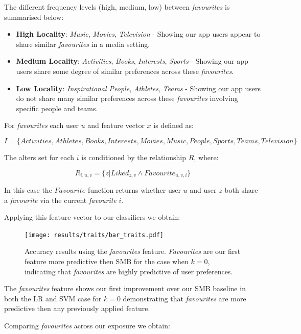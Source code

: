 The different frequency levels (high, medium, low) between \emph{favourites} is summarised below:
\begin{itemize}
\item \textbf{High Locality}: \emph{Music}, \emph{Movies}, \emph{Television} - Showing our app users appear to share similar \emph{favourites} in a media 
setting.
\item \textbf{Medium Locality}: \emph{Activities}, \emph{Books}, \emph{Interests}, \emph{Sports} - Showing our app users share some degree of similar preferences 
across these \emph{favourites}.
\item \textbf{Low Locality}: \emph{Inspirational People}, \emph{Athletes}, \emph{Teams} - Showing our app users do not share many similar preferences  
across these \emph{favourites} involving specific people and teams.
\end{itemize}

For \emph{favourites} each user $u$ and feature vector $x$ is defined as:

\[ I = \{Activities, Athletes, Books, Interests, Movies, Music, People, Sports, Teams, Television\} \]

The alters set for each $i$ is conditioned by the relationship $R$, where:

\[ R_{i,u,v} = \{z | Liked_{z,v} \wedge Favourite_{u,v,i}\} \]

In this case the $Favourite$ function returns whether user $u$ and user $z$ both share a \emph{favourite} via the current \emph{favourite} $i$.

Applying this feature vector to our classifiers we obtain:

\begin{figure}[h]
	\begin{center}
		\texttt{[image: results/traits/bar\_traits.pdf]}
		\caption{Accuracy results using the \emph{favourites} feature. \emph{Favourites} are our first feature more predictive then SMB
				 for the case when $k=0$, indicating that \emph{favourites} are highly predictive of user preferences.}
	\end{center}
\end{figure}

The \emph{favourites} feature shows our first improvement over our SMB baseline in both the LR and SVM case for $k=0$ demonstrating that 
\emph{favourites} are more predictive then any previously applied feature.

Comparing \emph{favourites} across our exposure we obtain:

